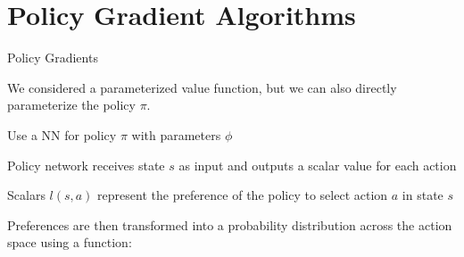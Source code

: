 \section{Policy Gradient Algorithms}

\begin{frame}[t]{Policy Gradients}

We considered a parameterized value function, but we can also directly parameterize the policy $\pi$.

\blist
    \item Use a NN for policy $\pi$ with parameters $\phi$
    \item Policy network receives state $s$ as input and outputs a scalar value for each action
    \item Scalars $l(s, a)$ represent the preference of the policy to select action $a$ in state $s$
    \item<2-> Preferences are then transformed into a probability distribution across the action space using a  function:
\elist

\vspace{-1em}

    
\end{frame}

